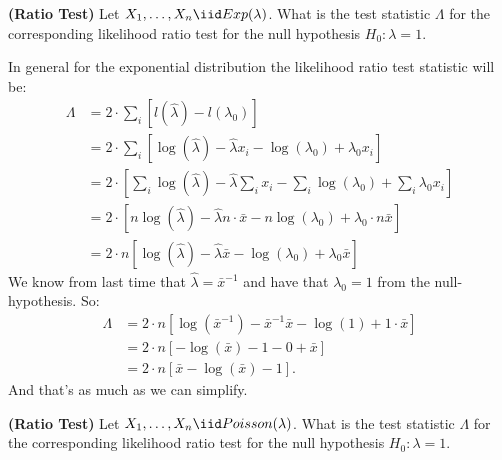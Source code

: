 
\textbf{(Ratio Test)} Let $X_1, \ldots, X_n \iid Exp(\lambda)$.
What is the test statistic $\Lambda$ for the corresponding likelihood 
ratio test for the null hypothesis $H_0: \lambda = 1$.


In general for the exponential distribution the likelihood ratio test statistic
will be:
\begin{align*}
\Lambda &= 2 \cdot \sum_i \left[ l(\hat{\lambda}) - l(\lambda_0)  \right] \\
&= 2 \cdot \sum_i \left[ \log(\hat{\lambda}) - \hat{\lambda} x_i - \log(\lambda_0) + \lambda_0 x_i  \right] \\
&= 2 \cdot \left[ \sum_i \log(\hat{\lambda}) - \hat{\lambda} \sum_i x_i - \sum_i \log(\lambda_0) + \sum_i \lambda_0 x_i  \right] \\
&= 2 \cdot \left[ n \log(\hat{\lambda}) - \hat{\lambda} n \cdot \bar{x} - n \log(\lambda_0) + \lambda_0 \cdot n \bar{x} \right] \\
&= 2 \cdot n \left[ \log(\hat{\lambda}) - \hat{\lambda} \bar{x} - \log(\lambda_0) + \lambda_0 \bar{x} \right]
\end{align*}
We know from last time that $\hat{\lambda} = \bar{x}^{-1}$ and have that $\lambda_0 = 1$
from the null-hypothesis. So:
\begin{align*}
\Lambda &= 2 \cdot n \left[ \log(\bar{x}^{-1}) - \bar{x}^{-1} \bar{x} - \log(1) + 1 \cdot \bar{x} \right] \\
&= 2 \cdot n \left[ - \log(\bar{x}) - 1 - 0 + \bar{x} \right] \\
&= 2 \cdot n \left[ \bar{x} - \log(\bar{x}) - 1  \right].
\end{align*}
And that's as much as we can simplify.


\textbf{(Ratio Test)} Let $X_1, \ldots, X_n \iid Poisson(\lambda)$.
What is the test statistic $\Lambda$ for the corresponding likelihood 
ratio test for the null hypothesis $H_0: \lambda = 1$.


